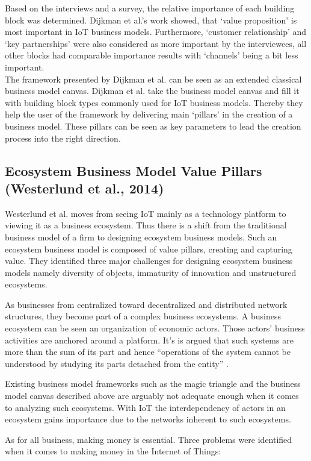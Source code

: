 		Based on the interviews and a survey, the relative importance of each building block was determined. Dijkman et al.'s work showed, that `value proposition' is most important in IoT business models. Furthermore, `customer relationship' and `key  partnerships' were also considered as more important by the interviewees, all other blocks had comparable importance results with  `channels' being a bit less important.\\
		The framework presented by Dijkman et al. can be seen as an extended classical business model canvas. Dijkman et al. take the business model canvas \cite{bmc} and fill it with building block types commonly used for IoT business models. Thereby they help the user of the framework by delivering main `pillars' in the creation of a business model. These pillars can be seen as key parameters to lead the creation process into the right direction. 

	\subsection{Ecosystem Business Model Value Pillars (Westerlund et al., 2014)}
		Westerlund et al. \cite{westerlund} moves from seeing IoT mainly as a technology platform to viewing it as a business ecosystem. Thus there is a shift from the traditional business model of a firm to designing ecosystem business models. Such an ecosystem business model is composed of value pillars, creating and capturing value. They identified three major challenges for designing ecosystem business models namely diversity of objects, immaturity of innovation and unstructured ecosystems.

		As businesses from centralized toward decentralized and distributed network structures, they become part of a complex business ecosystems. A business ecosystem can be seen an organization of economic actors. Those actors' business activities are anchored around a platform. It's is argued that such systems are more than the sum of its part and hence ``operations of the system cannot be understood by studying its parts detached from the entity'' \cite{westerlund}.

		Existing business model frameworks such as the magic triangle and the business model canvas described above are arguably not adequate enough when it comes to analyzing such ecosystems. With IoT the interdependency of actors in an ecosystem gains importance due to the networks inherent to such ecosystems.

		As for all business, making money is essential. Three problems were identified  when it comes to making money in the Internet of Things:

